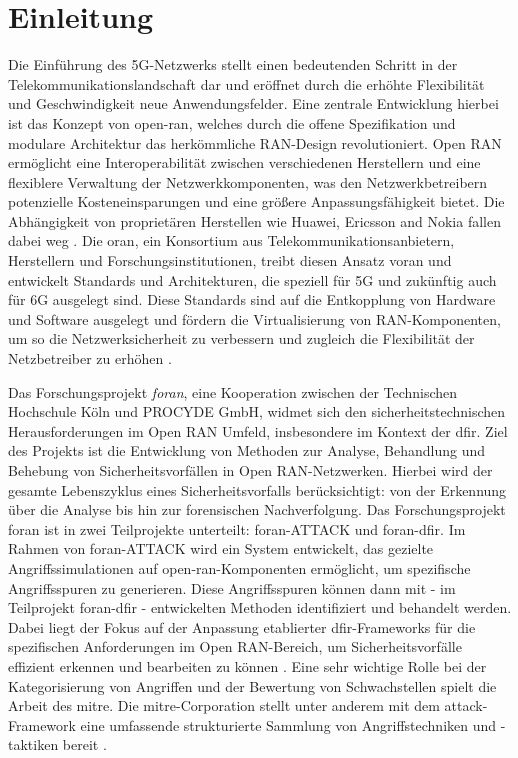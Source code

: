 \chapter{Einleitung}
\label{chap:Einleitung}

\par
Die Einführung des 5G-Netzwerks stellt einen bedeutenden Schritt in der Telekommunikationslandschaft dar und eröffnet durch die erhöhte Flexibilität und Geschwindigkeit neue Anwendungsfelder. Eine zentrale Entwicklung hierbei ist das Konzept von \gls{open-ran}, welches durch die offene Spezifikation und modulare Architektur das herkömmliche RAN-Design revolutioniert. Open RAN ermöglicht eine Interoperabilität zwischen verschiedenen Herstellern und eine flexiblere Verwaltung der Netzwerkkomponenten, was den Netzwerkbetreibern potenzielle Kosteneinsparungen und eine größere Anpassungsfähigkeit bietet. Die Abhängigkeit von proprietären Herstellen wie Huawei, Ericsson and Nokia fallen dabei weg \autocite{NokiaEricssonUnd}. Die \gls{oran}, ein Konsortium aus Telekommunikationsanbietern, Herstellern und Forschungsinstitutionen, treibt diesen Ansatz voran und entwickelt Standards und Architekturen, die speziell für 5G und zukünftig auch für 6G ausgelegt sind. Diese Standards sind auf die Entkopplung von Hardware und Software ausgelegt und fördern die Virtualisierung von RAN-Komponenten, um so die Netzwerksicherheit zu verbessern und zugleich die Flexibilität der Netzbetreiber zu erhöhen \autocite{5GFORAN}.

\par
Das Forschungsprojekt \textit{\gls{foran}}, eine Kooperation zwischen der Technischen Hochschule Köln und PROCYDE GmbH, widmet sich den sicherheitstechnischen Herausforderungen im Open RAN Umfeld, insbesondere im Kontext der \gls{dfir}. Ziel des Projekts ist die Entwicklung von Methoden zur Analyse, Behandlung und Behebung von Sicherheitsvorfällen in Open RAN-Netzwerken. Hierbei wird der gesamte Lebenszyklus eines Sicherheitsvorfalls berücksichtigt: von der Erkennung über die Analyse bis hin zur forensischen Nachverfolgung.
Das Forschungsprojekt \gls{foran} ist in zwei Teilprojekte unterteilt: \gls{foran}-ATTACK und \gls{foran}-\gls{dfir}. Im Rahmen von \gls{foran}-ATTACK wird ein System entwickelt, das gezielte Angriffssimulationen auf \gls{open-ran}-Komponenten ermöglicht, um spezifische Angriffsspuren zu generieren. Diese Angriffsspuren können dann mit - im Teilprojekt \gls{foran}-\gls{dfir} - entwickelten Methoden identifiziert und behandelt werden. Dabei liegt der Fokus auf der Anpassung etablierter \gls{dfir}-Frameworks für die spezifischen Anforderungen im Open RAN-Bereich, um Sicherheitsvorfälle effizient erkennen und bearbeiten zu können \autocite{5GFORAN}.
Eine sehr wichtige Rolle bei der Kategorisierung von Angriffen und der Bewertung von Schwachstellen spielt die Arbeit des \gls{mitre}.
Die \gls{mitre}-Corporation stellt unter anderem mit dem \gls{attack}-Framework eine umfassende strukturierte Sammlung von Angriffstechniken und -taktiken bereit \autocite{MITREATTCK} \autocite{SolvingProblemsSafer2024}.

